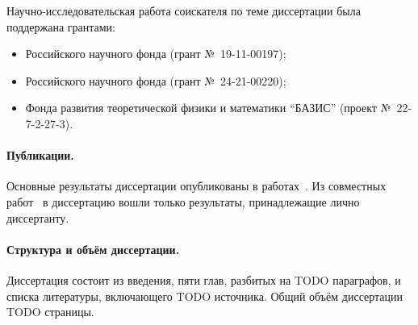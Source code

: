Научно-исследовательская работа соискателя по теме диссертации была поддержана грантами:
\begin{itemize}
	\item
		Российского научного фонда (грант №~19-11-00197);
	\item
		Российского научного фонда (грант №~24-21-00220);
	\item
		Фонда развития теоретической физики и математики ``БАЗИС'' (проект №~22-7-2-27-3).
\end{itemize}

\paragraph{Публикации.}
Основные результаты диссертации опубликованы в работах~.
Из совместных работ~
в диссертацию вошли только результаты, принадлежащие лично диссертанту.

\paragraph{Структура и объём диссертации.}
Диссертация состоит из введения, пяти глав, разбитых на TODO параграфов,
и списка литературы, включающего TODO источника.
Общий объём диссертации TODO страницы.
